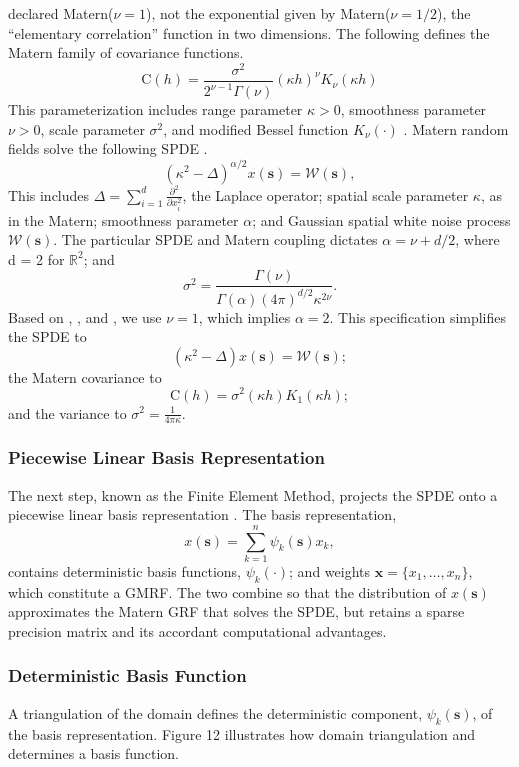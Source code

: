 \cite{Whittle1954} declared Matern($\nu = 1$), not the exponential given by Matern($\nu = 1/2$), the ``elementary correlation'' function in two dimensions. The following defines the Matern family of covariance functions.
$$\text{C}(h) = \frac{\sigma^{2}}{2^{\nu - 1}\Gamma(\nu)}(\kappa h)^{\nu}K_{\nu}(\kappa h)$$
This parameterization includes range parameter $\kappa > 0$, smoothness parameter $\nu > 0$, scale parameter $\sigma^{2}$, and modified Bessel function $K_{\nu}(\cdot)$ \citep{Schabenberger2004}. Matern random fields solve the following SPDE \citep{Whittle1954}.
$$(\kappa^{2} - \Delta)^{\alpha/2}x(\pmb{s}) = \mathcal{W}(\pmb{s}),$$ 
This includes $\Delta = \sum_{i=1}^{d} \frac{\partial^{2}}{\partial x_{i}^{2}}$, the Laplace operator; spatial scale parameter $\kappa$, as in the Matern; smoothness parameter $\alpha$; and Gaussian spatial white noise process $\mathcal{W}(\pmb{s})$. The particular SPDE and Matern coupling dictates $\alpha = \nu + d/2$, where d = 2 for $\mathbb{R}^{2}$; and $$\sigma^{2} = \frac{\Gamma(\nu)}{\Gamma(\alpha)(4\pi)^{d/2}\kappa^{2\nu}}.$$
Based on \citep{Whittle1954}, \citep{Mondal2017}, and \citep{Lindgren2015}, we use $\nu = 1$, which implies $\alpha = 2$. This specification simplifies the SPDE to 
$$ (\kappa^{2} - \Delta)x(\pmb{s}) = \mathcal{W}(\pmb{s});$$ 
the Matern covariance to 
$$\text{C}(h) = \sigma^{2}(\kappa h)K_{1}(\kappa h);$$
and the variance to $\sigma^{2} = \frac{1}{4 \pi \kappa}$.

\subsubsection{Piecewise Linear Basis Representation}

The next step, known as the Finite Element Method, projects the SPDE onto a piecewise linear basis representation \citep{Simpson2012}. The basis representation,
$$ x(\pmb{s}) = \sum_{k=1}^{n} \psi_{k}(\pmb{s})x_{k},$$
contains deterministic basis functions, $\psi_{k}(\cdot)$; and weights $\pmb{x} = \{x_{1},\dots,x_{n}\}$, which constitute a GMRF. The two combine so that the distribution of $x(\pmb{s})$ approximates the Matern GRF that solves the SPDE, but retains a sparse precision matrix and its accordant computational advantages.

\subsubsection{Deterministic Basis Function}

A triangulation of the domain defines the deterministic component, $\psi_{k}(\pmb{s})$, of the basis representation. Figure 12 \citep{Simpson2012} illustrates how domain triangulation and determines a basis function.

